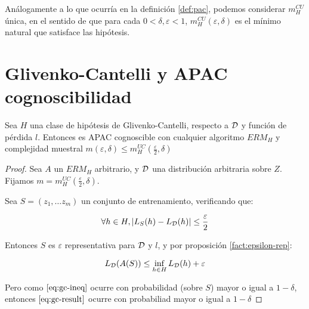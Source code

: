 Análogamente a lo que ocurría en la definición \ref{def:pac}, podemos considerar $m_H^{CU}$ única, en el sentido de
que para cada $0 < \delta, \varepsilon < 1$, $m_{H}^{CU}(\varepsilon, \delta)$ es el mínimo natural que satisface las 
hipótesis.

\section{Glivenko-Cantelli y APAC cognoscibilidad}

\begin{theorem}
Sea $H$ una clase de hipótesis de Glivenko-Cantelli, respecto a $\mathcal{D}$ y función de pérdida $l$. 
Entonces es APAC cognoscible con cualquier algoritmo $ERM_H$ y complejidad muestral
$m(\varepsilon, \delta) \le m_{H}^{UC} \left(\frac{\varepsilon}{2}, \delta \right)$ 
\label{th:gc-apac}
\end{theorem}

  \begin{proof}
  Sea $A$ un $ERM_H$ arbitrario, y $\mathcal{D}$ una distribución arbitraria sobre $Z$.
  Fijamos $m = m_{H}^{UC} \left(\frac{\varepsilon}{2}, \delta \right)$.

  Sea $S = (z_1, \ldots z_m)$ un conjunto de entrenamiento, verificando que: 

  \begin{equation}
    \forall h\in H, |L_{S}(h)-L_{\mathcal{D}}(h)| \le \frac{\varepsilon}{2}
    \label{eq:gc-ineq}
  \end{equation}

  Entonces $S$ es $\varepsilon$ representativa para $\mathcal{D}$ y $l$, y por proposición \ref{fact:epsilon-rep}:

  \begin{equation}
   L_{\mathcal{D}}(A(S)) \le \inf_{h\in H} L_{\mathcal{D}}(h) + \varepsilon
   \label{eq:gc-result}
  \end{equation}

  Pero como $\eqref{eq:gc-ineq}$ ocurre con probabilidad (sobre $S$) mayor o igual a $1-\delta$, entonces 
  $\eqref{eq:gc-result}$ ocurre con probabiliad mayor o igual a $1-\delta$
  
  \end{proof}
  
